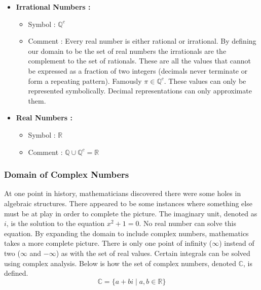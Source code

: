 \begin{itemize}
\begin{itemize}
            \item Comment On Elements :  Notice that $\mathbb{Z} \subset Q$.  Every integer is a rational number because the integer can represented as a fraction with the number 1 as the denominator ($3 = \frac{3}{1} \in Q$).
        \end{itemize}      
    \item \textbf{Irrational Numbers : }
        \begin{itemize}
            \item Symbol : $\mathbb{Q}^c$
            \item Comment : Every real number is either rational or irrational.  By defining our domain to be the set of real numbers the irrationals are the complement to the set of rationals.   These are all the values that cannot be expressed as a fraction of two integers (decimals never terminate or form a repeating pattern).  Famously $\pi \in \mathbb{Q}^c$.  These values can only be represented symbolically.  Decimal representations can only approximate them.
        \end{itemize}   
    \item \textbf{Real Numbers : }
        \begin{itemize}
            \item Symbol : $\mathbb{R}$
            \item Comment : $\mathbb{Q} \cup \mathbb{Q}^c = \mathbb{R}$
        \end{itemize}        
\end{itemize}
\newpage 

\subsubsection*{Domain of Complex Numbers}
At one point in history, mathematicians discovered there were some holes in algebraic structures.  There appeared to be some instances where something else must be at play in order to complete the picture.  The imaginary unit, denoted as $i$, is the solution to the equation $x^2+1 = 0$. No real number can solve this equation.  By expanding the domain to include complex numbers, mathematics takes a more complete picture. There is only one point of infinity ($\infty$) instead of two ($\infty$ and $-\infty$) as with the set of real values. Certain integrals can be solved using complex analysis.   Below is how the set of complex numbers, denoted $\mathbb{C}$, is defined.
$$\mathbb{C} = \{ a + bi \mid a,b\in \mathbb{R}\}$$

